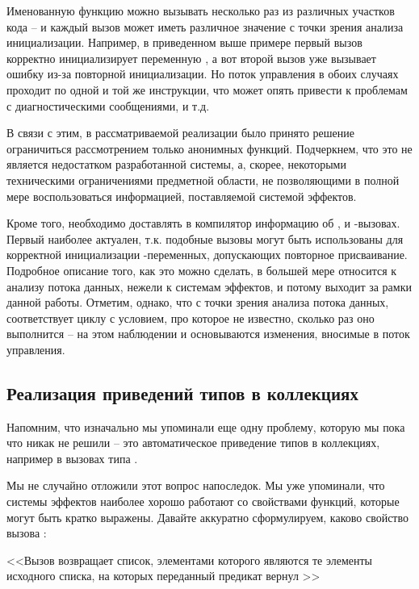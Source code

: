 Именованную функцию можно вызывать несколько раз из различных участков кода -- и каждый вызов может иметь различное значение с точки зрения анализа инициализации. Например, в приведенном выше примере первый вызов корректно инициализирует переменную , а вот второй вызов уже вызывает ошибку из-за повторной инициализации. Но поток управления в обоих случаях проходит по одной и той же инструкции, что может опять привести к проблемам с диагностическими сообщениями, и т.д.

В связи с этим, в рассматриваемой реализации было принято решение ограничиться рассмотрением только анонимных функций. Подчеркнем, что это не является недостатком разработанной системы, а, скорее, некоторыми техническими ограничениями предметной области, не позволяющими в полной мере воспользоваться информацией, поставляемой системой эффектов.

Кроме того, необходимо доставлять в компилятор информацию об ,  и -вызовах. Первый наиболее актуален, т.к. подобные вызовы могут быть использованы для корректной инициализации -переменных, допускающих повторное присваивание. Подробное описание того, как это можно сделать, в большей мере относится к анализу потока данных, нежели к системам эффектов, и потому выходит за рамки данной работы. Отметим, однако, что с точки зрения анализа потока данных,  соответствует циклу  с условием, про которое не известно, сколько раз оно выполнится -- на этом наблюдении и основываются изменения, вносимые в поток управления.


\subsection{Реализация приведений типов в коллекциях}

Напомним, что изначально мы упоминали еще одну проблему, которую мы пока что никак не решили -- это автоматическое приведение типов в коллекциях, например в вызовах типа .

Мы не случайно отложили этот вопрос напоследок. Мы уже упоминали, что системы эффектов наиболее хорошо работают со свойствами функций, которые могут быть кратко выражены. Давайте аккуратно сформулируем, каково свойство вызова :

<<Вызов  возвращает список, элементами которого являются те элементы исходного списка, на которых переданный предикат вернул  >>

